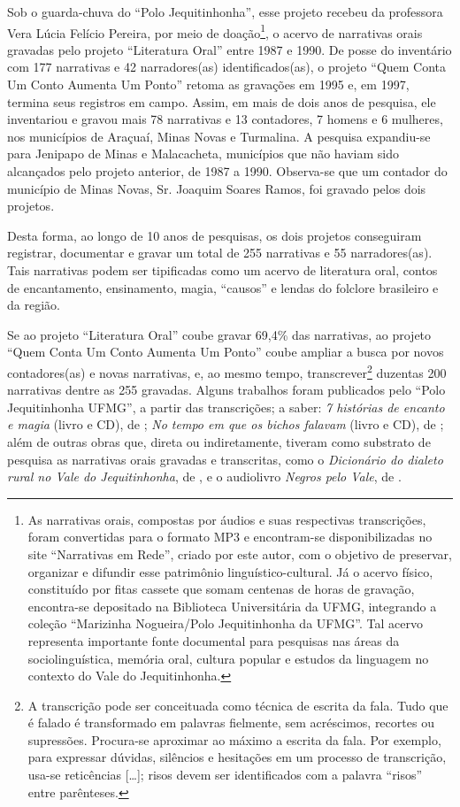 \documentclass[portuguese]{textolivre}
\begin{document}
Sob o guarda-chuva do “Polo Jequitinhonha”, esse projeto recebeu da professora Vera Lúcia Felício Pereira, por meio de doação\footnote{As narrativas orais, compostas por áudios e suas respectivas transcrições, foram convertidas para o formato MP3 e encontram-se disponibilizadas no site “Narrativas em Rede”, criado por este autor, com o objetivo de preservar, organizar e difundir esse patrimônio linguístico-cultural. Já o acervo físico, constituído por fitas cassete que somam centenas de horas de gravação, encontra-se depositado na Biblioteca Universitária da UFMG, integrando a coleção “Marizinha Nogueira/Polo Jequitinhonha da UFMG”. Tal acervo representa importante fonte documental para pesquisas nas áreas da sociolinguística, memória oral, cultura popular e estudos da linguagem no contexto do Vale do Jequitinhonha.}, o acervo de narrativas orais gravadas pelo projeto “Literatura Oral” entre 1987 e 1990. De posse do inventário com 177 narrativas e 42 narradores(as) identificados(as), o projeto “Quem Conta Um Conto Aumenta Um Ponto” retoma as gravações em 1995 e, em 1997, termina seus registros em campo. Assim, em mais de dois anos de pesquisa, ele inventariou e gravou mais 78 narrativas e 13 contadores, 7 homens e 6 mulheres, nos municípios de Araçuaí, Minas Novas e Turmalina. A pesquisa expandiu-se para Jenipapo de Minas e Malacacheta, municípios que não haviam sido alcançados pelo projeto anterior, de 1987 a 1990. Observa-se que um contador do município de Minas Novas, Sr. Joaquim Soares Ramos, foi gravado pelos dois projetos.

Desta forma, ao longo de 10 anos de pesquisas, os dois projetos conseguiram registrar, documentar e gravar um total de 255 narrativas e 55 narradores(as). Tais narrativas podem ser tipificadas como um acervo de literatura oral, contos de encantamento, ensinamento, magia, “causos” e lendas do folclore brasileiro e da região.

Se ao projeto “Literatura Oral” coube gravar 69,4\% das narrativas, ao projeto “Quem Conta Um Conto Aumenta Um Ponto” coube ampliar a busca por novos contadores(as) e novas narrativas, e, ao mesmo tempo, transcrever\footnote{A transcrição pode ser conceituada como técnica de escrita da fala. Tudo que é falado é transformado em palavras fielmente, sem acréscimos, recortes ou supressões. Procura-se aproximar ao máximo a escrita da fala. Por exemplo, para expressar dúvidas, silêncios e hesitações em um processo de transcrição, usa-se reticências […]; risos devem ser identificados com a palavra “risos” entre parênteses.} duzentas 200 narrativas dentre as 255 gravadas. Alguns trabalhos foram publicados pelo “Polo Jequitinhonha UFMG”, a partir das transcrições; a saber: \textit{7 histórias de encanto e magia} (livro e CD), de \textcite{Queiroz1999}; \textit{No tempo em que os bichos falavam} (livro e CD), de \textcite{Queiroz2009}; além de outras obras que, direta ou indiretamente, tiveram como substrato de pesquisa as narrativas orais gravadas e transcritas, como o \textit{Dicionário do dialeto rural no Vale do Jequitinhonha}, de \textcite{AntunesFerraz2013}, e o audiolivro \textit{Negros pelo Vale}, de \textcite{Souza2014}.
\end{document}
